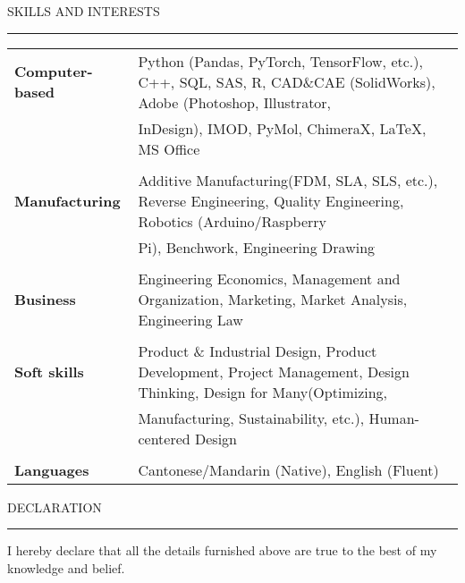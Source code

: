 \documentclass{resume} %
\renewenvironment{rSection}[1]{
\sectionskip
\textcolor{TsinghuaPurple}{\MakeUppercase{#1}}
\sectionlineskip
\hrule
\begin{list}{}{
\setlength{\leftmargin}{0em}
}
\item[]
}{
\end{list}
}
\begin{document}
\begin{rSection}{skills and INTERESTS}

\begin{tabular}{ @{} >{\bfseries}l @{\hspace{6ex}} l }  
Computer-based  & Python (Pandas, PyTorch, TensorFlow, etc.), C++, SQL, SAS, R, CAD\&CAE (SolidWorks), Adobe (Photoshop, Illustrator,\\
                & InDesign), IMOD, PyMol, ChimeraX, LaTeX, MS Office\\
                \\
Manufacturing   & Additive Manufacturing(FDM, SLA, SLS, etc.), Reverse Engineering, Quality Engineering, Robotics (Arduino/Raspberry \\
                & Pi), Benchwork, Engineering Drawing\\
                \\
Business        & Engineering Economics, Management and Organization, Marketing, Market Analysis, Engineering Law\\
                \\
Soft skills     & Product \& Industrial Design, Product Development, Project Management, Design Thinking, Design for Many(Optimizing, \\
                & Manufacturing, Sustainability, etc.), Human-centered Design\\
                \\
Languages   & Cantonese/Mandarin (Native), English (Fluent)\\

\end{tabular}   

\end{rSection}



\begin{rSection}{ Declaration  } \itemsep -3pt        

\item I hereby declare that all the details furnished above are true to the best of my knowledge and belief.   
  
\end{rSection}
\end{document}
